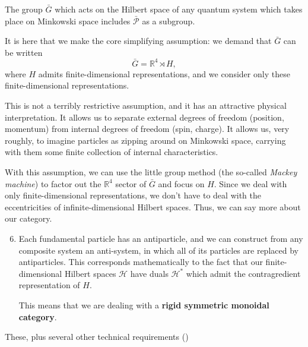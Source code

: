 \documentclass[a4paper]{report}
\newcommand{\R}{\mathbb{R}}
\theoremstyle{definition}
\theoremstyle{plain}
\theoremstyle{remark}
\begin{document}
The group $\bar{G}$ which acts on the Hilbert space of any quantum system which takes place on Minkowski space includes $\bar{\mathcal{P}}$ as a subgroup.

It is here that we make the core simplifying assumption: we demand that $\bar{G}$ can be written
\begin{equation*}
  \bar{G} = \R^{4} \rtimes H,
\end{equation*}
where $H$ admits finite-dimensional representations, and we consider only these finite-dimensional representations.

This is not a terribly restrictive assumption, and it has an attractive physical interpretation. It allows us to separate external degrees of freedom (position, momentum) from internal degrees of freedom (spin, charge). It allows us, very roughly, to imagine particles as zipping around on Minkowski space, carrying with them some finite collection of internal characteristics.

With this assumption, we can use the little group method (the so-called \emph{Mackey machine}) to factor out the $\R^{4}$ sector of $\bar{G}$ and focus on $H$. Since we deal with only finite-dimensional representations, we don't have to deal with the eccentricities of infinite-dimensional Hilbert spaces. Thus, we can say more about our category.
\begin{enumerate}
    \setcounter{enumi}{5}
  \item Each fundamental particle has an antiparticle, and we can construct from any composite system an anti-system, in which all of its particles are replaced by antiparticles. This corresponds mathematically to the fact that our finite-dimensional Hilbert spaces $\mathscr{H}$ have duals $\mathscr{H}^{*}$ which admit the contragredient representation of $H$.

    This means that we are dealing with a \textbf{rigid symmetric monoidal category}.
\end{enumerate}

These, plus several other technical requirements ()
\end{document}
